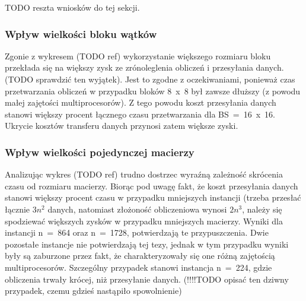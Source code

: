 \documentclass[12pt,a4paper]{article}
\begin{document}
TODO reszta wniosków do tej sekcji.

\subsubsection{Wpływ wielkości bloku wątków}

Zgonie z wykresem (TODO ref) wykorzystanie większego rozmiaru bloku przekłada się na większy zysk ze zrónoleglenia obliczeń i przesyłania danych. (TODO sprawdzić ten wyjątek). Jest to zgodne z oczekiwaniami, ponieważ czas przetwarzania obliczeń w przypadku bloków 8~x~8 był zawsze dłuższy (z powodu małej zajętości multiprocesorów). Z tego powodu koszt przesyłania danych stanowi większy procent łącznego czasu przetwarzania dla BS~=~16~x~16. Ukrycie kosztów transferu danych przynosi zatem większe zyski.

\subsubsection{Wpływ wielkości pojedynczej macierzy}

Analizując wykres (TODO ref) trudno dostrzec wyraźną zależność skrócenia czasu od rozmiaru macierzy. Biorąc pod uwagę fakt, że koszt przesyłania danych stanowi większy procent czasu w przypadku mniejszych instancji (trzeba przesłać łącznie $3n^2$ danych, natomiast złożoność obliczeniowa wynosi $2n^3$, należy się spodziewać większych zysków w przypadku mniejszych macierzy. Wyniki dla instancji n~=~864 oraz n~=~1728, potwierdzają te przypuszczenia. Dwie pozostałe instancje nie potwierdzają tej tezy, jednak w tym przypadku wyniki były są zaburzone przez fakt, że charakteryzowały się one różną zajętością multiprocesorów. Szczególny przypadek stanowi instancja n~=~224, gdzie obliczenia trwały krócej, niż przesyłanie danych. (!!!!TODO opisać ten dziwny przypadek, czemu gdzieś nastąpiło spowolnienie)
\end{document}
